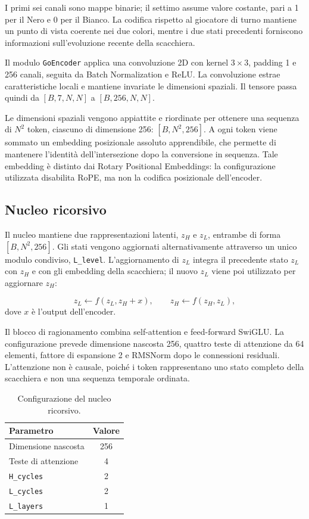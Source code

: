 I primi sei canali sono mappe binarie; il settimo assume valore costante, pari a 1 per il Nero e 0 per il Bianco. La codifica rispetto al giocatore di turno mantiene un punto di vista coerente nei due colori, mentre i due stati precedenti forniscono informazioni sull'evoluzione recente della scacchiera.

Il modulo \texttt{GoEncoder} applica una convoluzione 2D con kernel $3\times3$, padding 1 e 256 canali, seguita da Batch Normalization e ReLU. La convoluzione estrae caratteristiche locali e mantiene invariate le dimensioni spaziali. Il tensore passa quindi da $[B,7,N,N]$ a $[B,256,N,N]$.

Le dimensioni spaziali vengono appiattite e riordinate per ottenere una sequenza di $N^2$ token, ciascuno di dimensione 256: $[B,N^2,256]$. A ogni token viene sommato un embedding posizionale assoluto apprendibile, che permette di mantenere l'identità dell'intersezione dopo la conversione in sequenza. Tale embedding è distinto dai Rotary Positional Embeddings: la configurazione utilizzata disabilita RoPE, ma non la codifica posizionale dell'encoder.

\subsection{Nucleo ricorsivo}

Il nucleo mantiene due rappresentazioni latenti, $z_H$ e $z_L$, entrambe di forma $[B,N^2,256]$. Gli stati vengono aggiornati alternativamente attraverso un unico modulo condiviso, \texttt{L\_level}. L'aggiornamento di $z_L$ integra il precedente stato $z_L$ con $z_H$ e con gli embedding della scacchiera; il nuovo $z_L$ viene poi utilizzato per aggiornare $z_H$:

\[
z_L \leftarrow f(z_L,z_H+x), \qquad
z_H \leftarrow f(z_H,z_L),
\]
dove $x$ è l'output dell'encoder.

Il blocco di ragionamento combina self-attention e feed-forward SwiGLU. La configurazione prevede dimensione nascosta 256, quattro teste di attenzione da 64 elementi, fattore di espansione 2 e RMSNorm dopo le connessioni residuali. L'attenzione non è causale, poiché i token rappresentano uno stato completo della scacchiera e non una sequenza temporale ordinata.

\begin{table}[htbp]
    \centering
    \caption{Configurazione del nucleo ricorsivo.}
    \label{tab:recursive_core_config}
    \begin{tabular}{lc}
        \hline
        \textbf{Parametro} & \textbf{Valore} \\
        \hline
        Dimensione nascosta & 256 \\
        Teste di attenzione & 4 \\
        \texttt{H\_cycles} & 2 \\
        \texttt{L\_cycles} & 2 \\
        \texttt{L\_layers} & 1 \\
        \hline
    \end{tabular}
\end{table}

